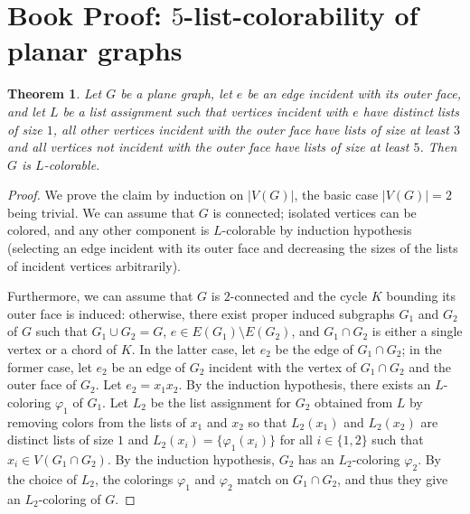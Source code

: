 \documentclass[12pt,twoside,openright,a4paper]{book}
\newtheorem{theorem}{Theorem}[chapter]
\begin{document}
\section{Book Proof: $5$-list-colorability of planar graphs}

\begin{theorem}\label{thm:5choosbook}
Let $G$ be a plane graph, let $e$ be an edge incident with its outer face,
and let $L$ be a list assignment such that vertices incident with $e$ have distinct
lists of size $1$, all other vertices incident with the outer face have lists of size at least $3$
and all vertices not incident with the outer face have lists of size at least $5$.  Then $G$ is $L$-colorable.
\end{theorem}
\begin{proof}
We prove the claim by induction on $|V(G)|$, the basic case $|V(G)|=2$ being trivial.
We can assume that $G$ is connected; isolated vertices can be colored, and any other component
is $L$-colorable by induction hypothesis (selecting an edge incident with its outer face and decreasing
the sizes of the lists of incident vertices arbitrarily).

Furthermore, we can assume that $G$ is $2$-connected
and the cycle $K$ bounding its outer face is induced: otherwise, there exist proper induced subgraphs $G_1$ and $G_2$
of $G$ such that $G_1\cup G_2=G$, $e\in E(G_1)\setminus E(G_2)$, and $G_1\cap G_2$ is either a single vertex or a chord of $K$.
In the latter case, let $e_2$ be the edge of $G_1\cap G_2$; in the former case, let $e_2$ be an edge of $G_2$ incident with the
vertex of $G_1\cap G_2$ and the outer face of $G_2$.  Let $e_2=x_1x_2$.  By the induction hypothesis, there exists an $L$-coloring $\varphi_1$ of
$G_1$.  Let $L_2$ be the list assignment for $G_2$ obtained from $L$ by removing colors from the lists of $x_1$ and $x_2$
so that $L_2(x_1)$ and $L_2(x_2)$ are distinct lists of size $1$ and $L_2(x_i)=\{\varphi_1(x_i)\}$ for all $i\in\{1,2\}$
such that $x_i\in V(G_1\cap G_2)$.  By the induction hypothesis, $G_2$ has an $L_2$-coloring $\varphi_2$.  By the choice
of $L_2$, the colorings $\varphi_1$ and $\varphi_2$ match on $G_1\cap G_2$, and thus they give an $L_2$-coloring of $G$.


\end{proof}
\end{document}
